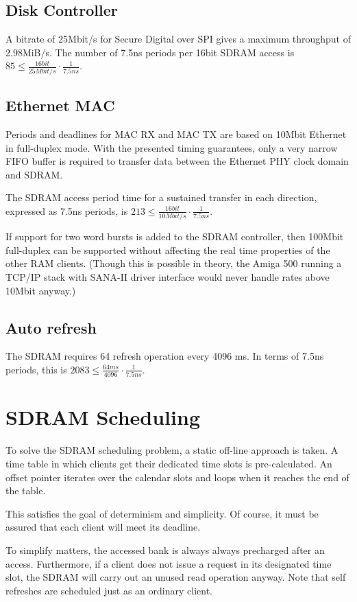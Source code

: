 \documentclass[a4paper]{report}
\begin{document}
\subsection{Disk Controller}
A bitrate of 25Mbit/s for Secure Digital over SPI gives a
maximum throughput of 2.98MiB/s. The number of 7.5ns periods
per 16bit SDRAM access is
$85 \le \frac{16 bit}{25 Mbit/s}\cdot \frac{1}{7.5 ns}$.

\subsection{Ethernet MAC}
Periods and deadlines for MAC RX and MAC TX are based on
\si{10}{Mbit} Ethernet in full-duplex mode. With the presented
timing guarantees, only a very narrow FIFO buffer is required
to transfer data between the Ethernet PHY clock domain and
SDRAM. 

The SDRAM access period time for a sustained transfer in each
direction, expressed as 7.5ns periods, is
$213 \le \frac{16 bit}{10 Mbit/s}\cdot \frac{1}{7.5 ns}$.

If support for two word bursts is added to the SDRAM
controller, then \si{100}{Mbit} full-duplex can be supported
without affecting the real time properties of the other RAM
clients. (Though this is possible in theory, the Amiga 500 running
a TCP/IP stack with SANA-II driver interface would never handle
rates above \si{10}{Mbit} anyway.)

\subsection{Auto refresh}
The SDRAM requires 64 refresh operation every 4096 ms. In terms
of 7.5ns periods, this is
$2083 \le \frac{64 ms}{4096}\cdot \frac{1}{7.5 ns}$.

\section{SDRAM Scheduling}
To solve the SDRAM scheduling problem, a static off-line
approach is taken.  A time table in which clients get their
dedicated time slots is pre-calculated.  An offset pointer
iterates over the calendar slots and loops when it reaches
the end of the table.

This satisfies the goal of determinism and simplicity. Of
course, it must be assured that each client will meet its deadline.

To simplify matters, the accessed bank is always always
precharged after an access. Furthermore, if a client does not
issue a request in its designated time slot, the SDRAM will
carry out an unused read operation anyway.  Note that
self refreshes are scheduled just as an ordinary client.
\end{document}

